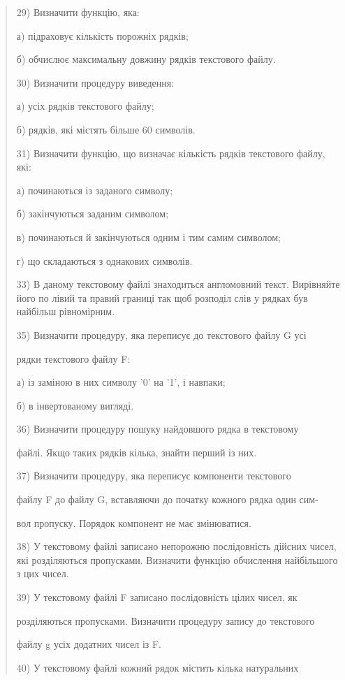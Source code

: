 \documentclass[]{article}
\begin{document}
\begin{quote}
29) Визначити функцію, яка:

а) підраховує кількість порожніх рядків;

б) обчислює максимальну довжину рядків текстового файлу.

30) Визначити процедуру виведення:

а) усіх рядків текстового файлу;

б) рядків, які містять більше 60 символів.

31) Визначити функцію, що визначає кількість рядків текстового файлу,
які:

а) починаються із заданого символу;

б) закінчуються заданим символом;

в) починаються й закінчуються одним і тим самим символом;

г) що складаються з однакових символів.

33) В даному текстовому файлі знаходиться англомовний текст. Вирівняйте
його по лівий та правий границі так щоб розподіл слів у рядках був
найбільш рівномірним.

35) Визначити процедуру, яка переписує до текстового файлу G усі

рядки текстового файлу F:

а) із заміною в них символу '0' на '1', і навпаки;

б) в інвертованому вигляді.

36) Визначити процедуру пошуку найдовшого рядка в текстовому

файлі. Якщо таких рядків кілька, знайти перший із них.

37) Визначити процедуру, яка переписує компоненти текстового

файлу F до файлу G, вставляючи до початку кожного рядка один сим-

вол пропуску. Порядок компонент не має змінюватися.

38) У текстовому файлі записано непорожню послідовність дійсних чисел,
які розділяються пропусками. Визначити функцію обчислення найбільшого з
цих чисел.

39) У текстовому файлі F записано послідовність цілих чисел, як

розділяються пропусками. Визначити процедуру запису до текстового

файлу g усіх додатних чисел із F.

40) У текстовому файлі кожний рядок містить кілька натуральних


\end{quote}
\end{document}
